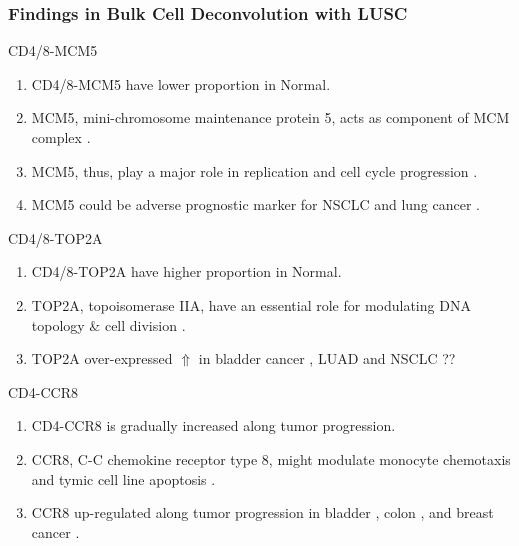 \documentclass{beamer}
\begin{document}
    \begin{frame}[allowframebreaks]
        \frametitle{Findings in Bulk Cell Deconvolution with LUSC}

        \begin{block}{CD4/8-MCM5}
            \begin{enumerate}
                \item CD4/8-MCM5 have lower proportion in Normal.
                \item MCM5, mini-chromosome maintenance protein 5, acts as component of MCM complex \cite{MCM5-1}.
                \item MCM5, thus, play a major role in replication and cell cycle progression \cite{MCM5-2}.
                \item MCM5 could be adverse prognostic marker for NSCLC \cite{MCM5-3} and lung cancer \cite{MCM5-4}.
            \end{enumerate}
        \end{block}

        \begin{block}{CD4/8-TOP2A}
            \begin{enumerate}
                \item CD4/8-TOP2A have higher proportion in Normal.
                \item TOP2A, topoisomerase IIA, have an essential role for modulating DNA topology \& cell division \cite{TOP2A-1}.
                \item TOP2A over-expressed $\Uparrow$ in bladder cancer \cite{TOP2A-2}, LUAD \cite{TOP2A-3} and NSCLC \cite{TOP2A-4} ??
            \end{enumerate}
        \end{block}

        \begin{block}{CD4-CCR8}
            \begin{enumerate}
                \item CD4-CCR8 is gradually increased along tumor progression.
                \item CCR8, C-C chemokine receptor type 8, might modulate monocyte chemotaxis and tymic cell line apoptosis \cite{CCR8-1}.
                \item CCR8 up-regulated along tumor progression in bladder \cite{CCR8-2}, colon \cite{CCR8-3}, and breast cancer \cite{CCR8-4}.
            \end{enumerate}
        \end{block}


\end{frame}
\end{document}
